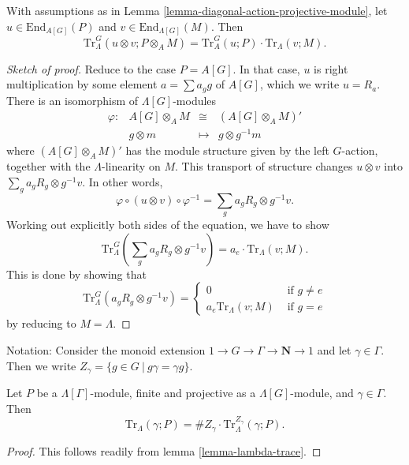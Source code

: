 \begin{lemma}
\label{lemma-multiplicative-trace}
With assumptions as in
Lemma \ref{lemma-diagonal-action-projective-module},
let
$u\in \text{End}_{A[G]}(P)$ and $v\in \text{End}_{\Lambda[G]}(M)$. Then
$$
\text{Tr}_\Lambda^G \left(u\otimes v; P\otimes_A M\right) = \text{Tr}_A^G(u;
P)\cdot \text{Tr}_\Lambda(v;M).
$$
\end{lemma}

\begin{proof}[Sketch of proof]
Reduce to the case $P=A[G]$. In that case, $u$ is right multiplication by some
element $a = \sum a_gg$ of $A[G]$, which we write $u = R_a$. There is an
isomorphism of $\Lambda[G]$-modules
$$
\begin{matrix}
\varphi: &A[G]\otimes_A M &\cong &\left(A[G]\otimes_A M\right)'\\
&g\otimes m &\longmapsto & g\otimes g^{-1}m
\end{matrix}
$$
where $\left(A[G]\otimes_A M\right)'$ has the module structure given by the
left $G$-action, together with the $\Lambda$-linearity on $M$. This transport
of structure changes $u \otimes v$ into $\sum_ga_gR_g\otimes g^{-1}v$. In other
words,
$$
\varphi \circ (u \otimes v) \circ \varphi^{-1}
=
\sum_ga_gR_g\otimes g^{-1}v.
$$
Working out explicitly both sides of the equation, we have to show
$$
\text{Tr}_\Lambda^G\left(\sum_g a_gR_g\otimes g^{-1}v\right) = a_e\cdot
\text{Tr}_\Lambda(v; M).
$$
This is done by showing that
$$
\text{Tr}_\Lambda^G\left(a_gR_g\otimes g^{-1}v\right) =
\left\{
\begin{matrix}
0 & \text{ if } g\neq e\\
a_e\text{Tr}_\Lambda\left(v; M\right) & \text{ if }g=e
\end{matrix}
\right.
$$
by reducing to $M=\Lambda$.
\end{proof}

\noindent
Notation:
Consider the monoid extension $1 \to G\to \Gamma\to \mathbf{N} \to 1$ and let
$\gamma\in \Gamma$.
Then we write $Z_\gamma = \{g\in G\ | \ g\gamma=\gamma g\}$.

\begin{lemma}
\label{lemma-gamma-z-gamma-trace}
Let $P$ be a $\Lambda[\Gamma]$-module, finite and projective as a
$\Lambda[G]$-module, and $\gamma \in \Gamma$. Then
$$
\text{Tr}_{\Lambda}(\gamma; P) =
\# Z_\gamma \cdot \text{Tr}_\Lambda^{Z_\gamma}\left(\gamma; P\right).
$$	
\end{lemma}

\begin{proof}
This follows readily from lemma \ref{lemma-lambda-trace}.
\end{proof}


